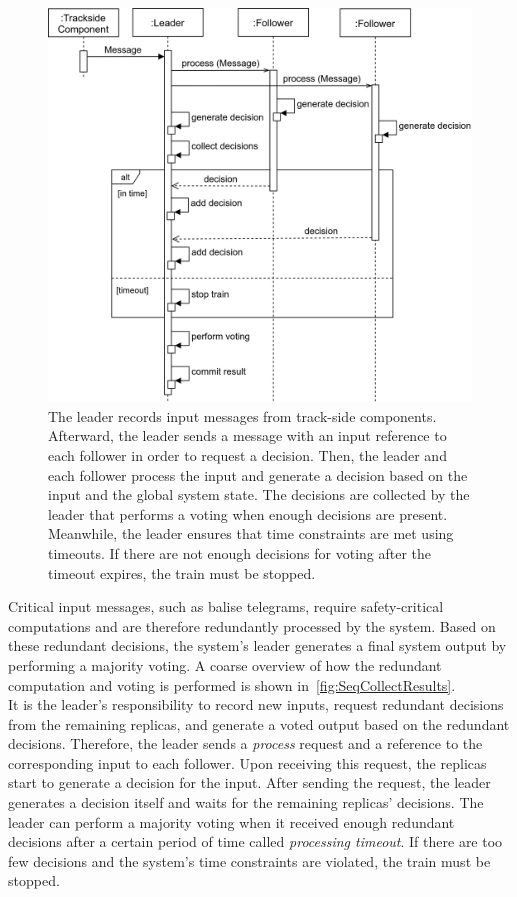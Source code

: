 \begin{figure}[!ht]
	\centering
	\includegraphics[width=0.8\linewidth]{images/sequence/CollectResults}
	\caption{The leader records input messages from track-side components. Afterward, the leader sends a message with an input reference to each follower in order to request a decision. Then, the leader and each follower process the input and generate a decision based on the input and the global system state. The decisions are collected by the leader that performs a voting when enough decisions are present. Meanwhile, the leader ensures that time constraints are met using timeouts. If there are not enough decisions for voting after the timeout expires, the train must be stopped.}
	\label{fig:SeqCollectResults}
\end{figure}

Critical input messages, such as balise telegrams, require safety-critical computations and are therefore redundantly processed by the system.
Based on these redundant decisions, the system's leader generates a final system output by performing a majority voting.
A coarse overview of how the redundant computation and voting is performed is shown in~\autoref{fig:SeqCollectResults}.
\\

\noindent
It is the leader's responsibility to record new inputs, request redundant decisions from the remaining replicas, and generate a voted output based on the redundant decisions.
Therefore, the leader sends a \textit{process} request and a reference to the corresponding input to each follower.
Upon receiving this request, the replicas start to generate a decision for the input.
After sending the request, the leader generates a decision itself and waits for the remaining replicas' decisions.
The leader can perform a majority voting when it received enough redundant decisions after a certain period of time called \textit{processing timeout}.
If there are too few decisions and the system's time constraints are violated, the train must be stopped.
\\


